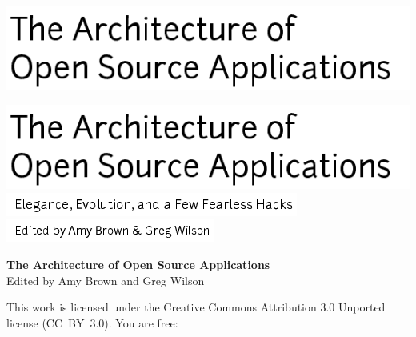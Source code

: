 \newpage

\thispagestyle{empty}
\hspace{-2cm}\includegraphics[width=400pt]{../images/frontmatter/title.png} 

\newpage

\thispagestyle{empty}
\mbox{}    %

\newpage

\thispagestyle{empty}
\hspace{-2cm}\includegraphics[width=400pt]{../images/frontmatter/title.png} 
\\
\vspace{0.5cm}
\hspace{2.8cm}\includegraphics{../images/frontmatter/subtitle.png}
\\[13.5cm]
\vspace{0.5cm}
\hspace{6.5cm}\includegraphics{../images/frontmatter/eds.png}

\newpage

\thispagestyle{empty}

\small
\noindent \textbf{The Architecture of Open Source Applications} \\
Edited by Amy Brown and Greg Wilson

\vspace{0.15cm}

\noindent
This work is licensed under the Creative Commons Attribution 3.0
Unported license (CC~BY~3.0).  You are free:

